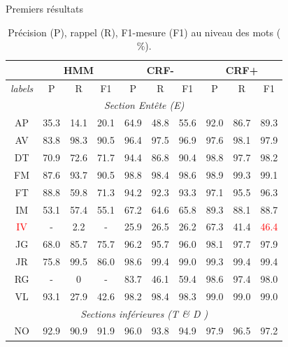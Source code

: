 \documentclass[newPxFont,pagenumber]{beamer}
\begin{document}
\begin{frame}[c]{Premiers résultats \cite{tagny2017sectNerhmmcrf}}
\begin{table}[!htb]
\scriptsize

\centering
\begin{tabular}{|c|c|c|c|c|c|c|c|c|c|}
\hline
 & \multicolumn{3}{c|}{HMM}  & \multicolumn{3}{c|}{CRF-}  & \multicolumn{3}{c|}{CRF+} \\
\hline
\textit{labels} & P & R & F1 & P & R & F1 & P & R & F1 \\
\hline
 \multicolumn{10}{|c|}{\textit{\textit{Section Entête (E)}}} \\
\hline
 AP & 35.3 &  14.1 & 20.1  & 64.9 & 48.8 & 55.6 & 92.0 & 86.7 & 89.3 \\
\hline
 AV & 83.8 &  98.3 & 90.5  & 96.4 & 97.5 & 96.9 & 97.6 & 98.1 & 97.9 \\
 \hline
 DT & 70.9 & 72.6 & 71.7  & 94.4 & 86.8 & 90.4 & 98.8 & 97.7 & 98.2 \\
 \hline
FM & 87.6 &  93.7 & 90.5  & 98.8 & 98.4 & 98.6 & 98.9 & 99.3 & 99.1 \\
 \hline
FT &  88.8 & 59.8 & 71.3  & 94.2 & 92.3 & 93.3 & 97.1 & 95.5 & 96.3 \\
 \hline
IM  & 53.1 & 57.4 & 55.1  & 67.2 & 64.6 & 65.8 &  89.3 & 88.1 & 88.7  \\
 \hline
 \textcolor{red}{IV} & - & 2.2 & - & 25.9 & 26.5 & 26.2 & 67.3 & 41.4 & \textcolor{red}{46.4} \\
 \hline
JG  & 68.0 & 85.7 & 75.7  & 96.2 & 95.7 & 96.0 & 98.1 & 97.7 & 97.9 \\
 \hline
JR  & 75.8 & 99.5 & 86.0  & 98.6 & 99.4 & 99.0 & 99.3 & 99.4 & 99.4 \\
 \hline
RG  &  - & 0  & - & 83.7 & 46.1 & 59.4 & 98.6 & 97.4 & 98.0 \\
\hline
VL & 93.1 & 27.9 & 42.6  & 98.2 & 98.4 & 98.3 & 99.0 & 99.0 & 99.0 \\
\hline
 \multicolumn{10}{|c|}{\textit{\textit{Sections inférieures (T \& D )}}} \\
 \hline
NO & 92.9 & 90.9 & 91.9 & 96.0 & 93.8 & 94.9 & 97.9 & 96.5 & 97.2\\
\hline
\end{tabular}
\caption{Précision (P), rappel (R), F1-mesure (F1) au niveau des mots ($\%$).}\label{prf-entity}
\end{table}
\end{frame}
\end{document}
